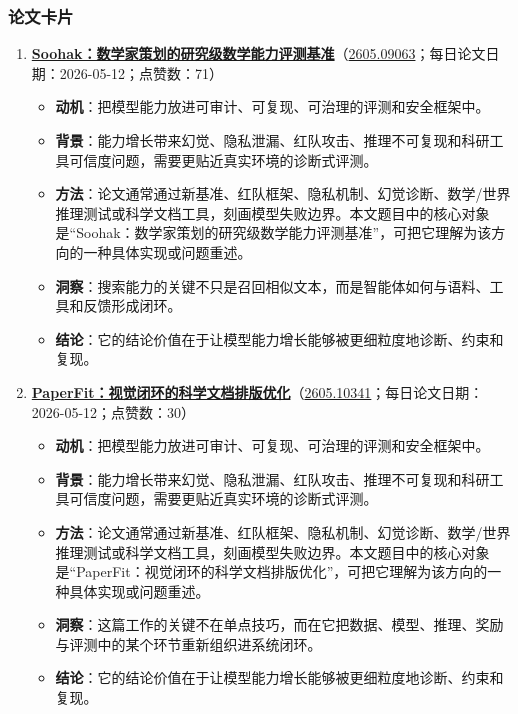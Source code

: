 \subsubsection{论文卡片}
\begin{enumerate}[leftmargin=1.5em]
  \item \textbf{\href{https://huggingface.co/papers/2605.09063}{Soohak：数学家策划的研究级数学能力评测基准}}（\href{https://arxiv.org/abs/2605.09063}{2605.09063}；每日论文日期：2026-05-12；点赞数：71）
  \begin{itemize}[leftmargin=1.5em]
    \item \textbf{动机}：把模型能力放进可审计、可复现、可治理的评测和安全框架中。
    \item \textbf{背景}：能力增长带来幻觉、隐私泄漏、红队攻击、推理不可复现和科研工具可信度问题，需要更贴近真实环境的诊断式评测。
    \item \textbf{方法}：论文通常通过新基准、红队框架、隐私机制、幻觉诊断、数学/世界推理测试或科学文档工具，刻画模型失败边界。本文题目中的核心对象是“Soohak：数学家策划的研究级数学能力评测基准”，可把它理解为该方向的一种具体实现或问题重述。
    \item \textbf{洞察}：搜索能力的关键不只是召回相似文本，而是智能体如何与语料、工具和反馈形成闭环。
    \item \textbf{结论}：它的结论价值在于让模型能力增长能够被更细粒度地诊断、约束和复现。
  \end{itemize}
  \item \textbf{\href{https://huggingface.co/papers/2605.10341}{PaperFit：视觉闭环的科学文档排版优化}}（\href{https://arxiv.org/abs/2605.10341}{2605.10341}；每日论文日期：2026-05-12；点赞数：30）
  \begin{itemize}[leftmargin=1.5em]
    \item \textbf{动机}：把模型能力放进可审计、可复现、可治理的评测和安全框架中。
    \item \textbf{背景}：能力增长带来幻觉、隐私泄漏、红队攻击、推理不可复现和科研工具可信度问题，需要更贴近真实环境的诊断式评测。
    \item \textbf{方法}：论文通常通过新基准、红队框架、隐私机制、幻觉诊断、数学/世界推理测试或科学文档工具，刻画模型失败边界。本文题目中的核心对象是“PaperFit：视觉闭环的科学文档排版优化”，可把它理解为该方向的一种具体实现或问题重述。
    \item \textbf{洞察}：这篇工作的关键不在单点技巧，而在它把数据、模型、推理、奖励与评测中的某个环节重新组织进系统闭环。
    \item \textbf{结论}：它的结论价值在于让模型能力增长能够被更细粒度地诊断、约束和复现。

\end{itemize}
\end{enumerate}
